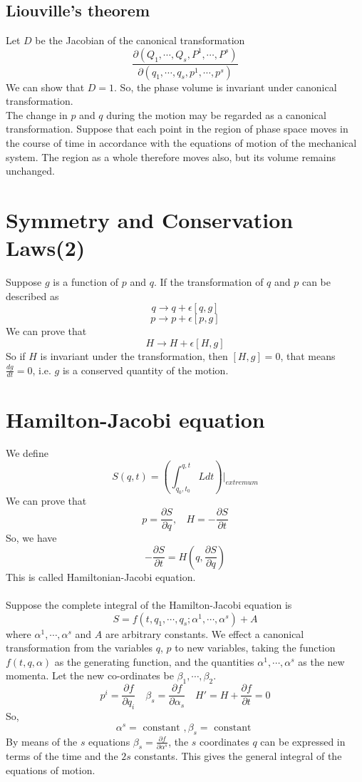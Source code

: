 \documentclass{article}
\begin{document}
\subsection{Liouville's theorem}
Let $D$ be the Jacobian of the canonical transformation 
\[\frac{\partial(Q_1,\cdots,Q_s,P^1,\cdots,P^s)}{\partial(q_1,\cdots,q_s,p^1,\cdots,p^s)}\]
We can show that $D=1$. So, the phase volume is invariant under canonical transformation. \\
The change in $p$ and $q$ during the motion may be regarded as a canonical transformation. Suppose that each point in the region of phase space moves in the course of time in accordance with the equations of motion of the mechanical system. The region as a whole therefore moves also, but its volume remains unchanged.

\section{Symmetry and Conservation Laws(2)}
Suppose $g$ is a function of $p$ and $q$. If the transformation of $q$ and $p$ can be described as
\[q \rightarrow q + \epsilon [q,g]\]
\[p \rightarrow p + \epsilon [p,g]\]
We can prove that 
\[H \rightarrow H + \epsilon[H,g]\]
So if $H$ is invariant under the transformation, then $[H,g] = 0$, that means $\frac{dg}{dt} = 0$, i.e. $g$ is a conserved quantity of the motion.

\section{Hamilton-Jacobi equation}
We define
\[S(q,t)=\left(\int_{q_0,t_0}^{q,t} L dt\right)|_{extremum}\]
We can prove that
\[p = \frac{\partial S}{\partial q}, \ \ \ \ H = -\frac{\partial S}{\partial t}\]
So, we have
\[-\frac{\partial S}{\partial t} = H (q,\frac{\partial S}{\partial q})\]
This is called Hamiltonian-Jacobi equation.\\ \\
Suppose the complete integral of the Hamilton-Jacobi equation is
\[S=f(t,q_1,\cdots,q_s;\alpha^1,\cdots,\alpha^s)+A\]
where $\alpha^1,\cdots,\alpha^s$ and $A$ are arbitrary constants. We effect a canonical transformation from the
variables $q$, $p$ to new variables, taking the function $f(t,q,\alpha)$ as the generating function, and the quantities $\alpha^1,\cdots,\alpha^s$ as the new momenta.
Let the new co-ordinates be $\beta_1,\cdots,\beta_2$.
\[p^i = \frac{\partial f}{\partial q_i} \quad \beta_s = \frac{\partial f}{\partial \alpha_s} \quad H' = H + \frac{\partial f}{\partial t} =0\]
So,
\[\alpha^s = \mbox{ constant }, \beta_s = \mbox{ constant }\]
By means of the $s$ equations $\beta_s = \frac{\partial f}{\partial \alpha^s}$, the $s$ coordinates $q$ can be expressed in terms of the time and the $2s$ constants. This gives the general integral of the equations of motion.
\end{document}
